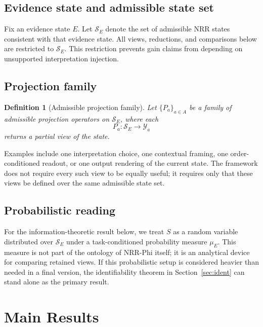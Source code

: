 \documentclass[11pt,a4paper]{article}
\newtheorem{definition}{Definition}
\begin{document}
\subsection{Evidence state and admissible state set}

Fix an evidence state $E$. Let $\mathcal{S}_E$ denote the set of admissible NRR states consistent with that evidence state. All views, reductions, and comparisons below are restricted to $\mathcal{S}_E$. This restriction prevents gain claims from depending on unsupported interpretation injection.

\subsection{Projection family}

\begin{definition}[Admissible projection family]
Let $\{P_a\}_{a \in A}$ be a family of admissible projection operators on $\mathcal{S}_E$, where each
\begin{equation}
P_a : \mathcal{S}_E \to \mathcal{Y}_a
\end{equation}
returns a partial view of the state.
\end{definition}

Examples include one interpretation choice, one contextual framing, one order-conditioned readout, or one output rendering of the current state. The framework does not require every such view to be equally useful; it requires only that these views be defined over the same admissible state set.

\subsection{Probabilistic reading}

For the information-theoretic result below, we treat $S$ as a random variable distributed over $\mathcal{S}_E$ under a task-conditioned probability measure $\mu_E$. This measure is not part of the ontology of NRR-Phi \cite{saito2026phi} itself; it is an analytical device for comparing retained views. If this probabilistic setup is considered heavier than needed in a final version, the identifiability theorem in Section~\ref{sec:ident} can stand alone as the primary result.

\section{Main Results}
\label{sec:results}
\end{document}
